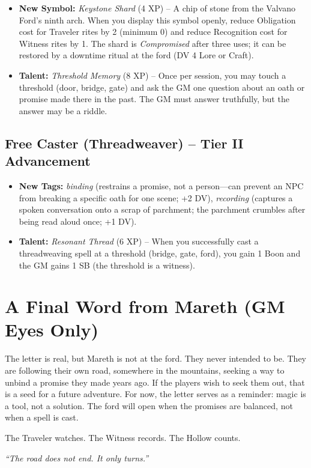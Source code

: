 \documentclass[10pt,twoside]{book}
\begin{document}
\begin{itemize}
\item \textbf{New Symbol:} \textit{Keystone Shard} (4 XP) -- A chip of stone from the Valvano Ford's ninth arch. When you display this symbol openly, reduce Obligation cost for Traveler rites by 2 (minimum 0) and reduce Recognition cost for Witness rites by 1. The shard is \textit{Compromised} after three uses; it can be restored by a downtime ritual at the ford (DV 4 Lore or Craft).
\item \textbf{Talent:} \textit{Threshold Memory} (8 XP) -- Once per session, you may touch a threshold (door, bridge, gate) and ask the GM one question about an oath or promise made there in the past. The GM must answer truthfully, but the answer may be a riddle.
\end{itemize}

\subsection*{Free Caster (Threadweaver) -- Tier II Advancement}

\begin{itemize}
\item \textbf{New Tags:} \textit{binding} (restrains a promise, not a person---can prevent an NPC from breaking a specific oath for one scene; +2 DV), \textit{recording} (captures a spoken conversation onto a scrap of parchment; the parchment crumbles after being read aloud once; +1 DV).
\item \textbf{Talent:} \textit{Resonant Thread} (6 XP) -- When you successfully cast a threadweaving spell at a threshold (bridge, gate, ford), you gain 1 Boon and the GM gains 1 SB (the threshold is a witness).
\end{itemize}

\section*{A Final Word from Mareth (GM Eyes Only)}

The letter is real, but Mareth is not at the ford. They never intended to be. They are following their own road, somewhere in the mountains, seeking a way to unbind a promise they made years ago. If the players wish to seek them out, that is a seed for a future adventure. For now, the letter serves as a reminder: magic is a tool, not a solution. The ford will open when the promises are balanced, not when a spell is cast.

The Traveler watches. The Witness records. The Hollow counts.

\vspace{1cm}
\begin{center}
\emph{``The road does not end. It only turns.''}
\end{center}
\end{document}
